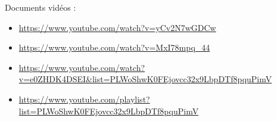 \documentclass{article}
\begin{document}
Documents vidéos :
\begin{itemize}
    \item \url{https://www.youtube.com/watch?v=yCv2N7wGDCw}
    \item \url{https://www.youtube.com/watch?v=MxI78mpq_44}
    \item \url{https://www.youtube.com/watch?v=e0ZHDK4DSEI&list=PLWoShwK0FEjovcc32x9LbpDTf8pquPimV}
    \item \url{https://www.youtube.com/playlist?list=PLWoShwK0FEjovcc32x9LbpDTf8pquPimV} \\
\end{itemize}
\end{document}

